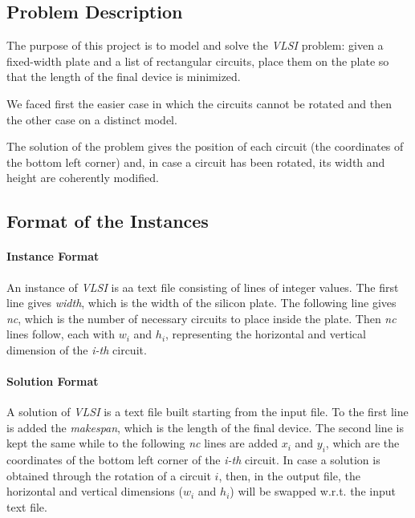 \subsection{Problem Description} 
    The purpose of this project is to model and solve the \textit{VLSI} problem: given a fixed-width plate and a list of 
    rectangular circuits, place them on the plate so that the length of the final device is minimized. 
    
    We faced first the easier case in which the circuits cannot be rotated and then the other case on a distinct model.

    The solution of the problem gives the position of each circuit (the coordinates of the bottom left corner) and,
    in case a circuit has been rotated, its width and height are coherently modified.


\subsection{Format of the Instances}
    \paragraph*{Instance Format}
        An instance of \textit{VLSI} is aa text file consisting of lines of integer values. The first line gives \textit{width}, 
        which is the width of the silicon plate. The following line gives \textit{nc}, which is the number of necessary circuits 
        to place inside the plate. Then \textit{nc} lines follow, each with $w_i$ and $h_i$, representing the horizontal and 
        vertical dimension of the \textit{i-th} circuit.

    \paragraph*{Solution Format}
        A solution of \textit{VLSI} is a text file built starting from the input file. To the first line is added the \textit{makespan},
        which is the length of the final device. The second line is kept the same while to the following \textit{nc} lines are added
        $x_i$ and $y_i$, which are the coordinates of the bottom left corner of the \textit{i-th} circuit. In case a solution is obtained 
        through the rotation of a circuit $i$, then, in the output file, the horizontal and vertical dimensions ($w_i$ and $h_i$) 
        will be swapped w.r.t. the input text file.


